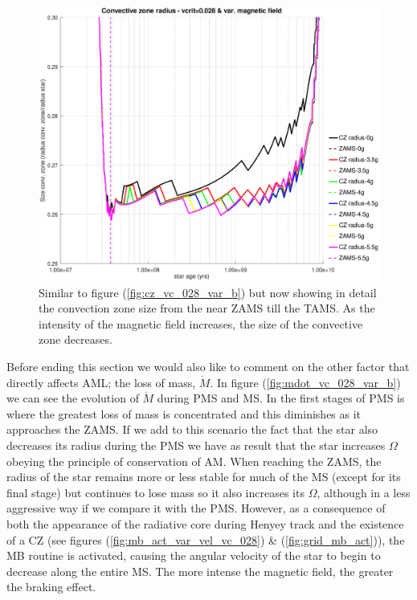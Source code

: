 \documentclass[fleqn,usenatbib]{mnras}
\begin{document}
\begin{figure}
	\includegraphics[trim = 30mm 15mm 20mm 15mm, clip,width=\columnwidth]{figures/cz_vc_028_var_g_z1.eps}
    \caption{Similar to figure (\ref{fig:cz_vc_028_var_b}) but now showing in detail the convection zone size from the near ZAMS till the TAMS. As the intensity of the magnetic field increases, the size of the convective zone decreases.}
    \label{fig:cz_vc_028_var_b_z1}
\end{figure}

Before ending this section we would also like to comment on the other factor that directly affects AML; the loss of mass, $\Dot{M}$. In figure (\ref{fig:mdot_vc_028_var_b}) we can see the evolution of $\Dot{M}$ during PMS and MS. In the first stages of PMS is where the greatest loss of mass is concentrated and this diminishes as it approaches the ZAMS. If we add to this scenario the fact that the star also decreases its radius during the PMS we have as result that the star increases $\Omega$ obeying the principle of conservation of AM. When reaching the ZAMS, the radius of the star remains more or less stable for much of the MS (except for its final stage) but continues to lose mass so it also increases its $\Omega$, although in a less aggressive way if we compare it with the PMS. However, as a consequence of both the appearance of the radiative core during Henyey track and the existence of a CZ (see figures (\ref{fig:mb_act_var_vel_vc_028}) \& (\ref{fig:grid_mb_act})), the MB routine is activated, causing the angular velocity of the star to begin to decrease along the entire MS. The more intense the magnetic field, the greater the braking effect.\par 
\end{document}
